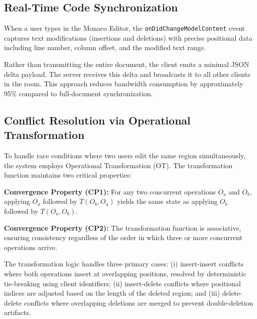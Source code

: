 \documentclass[conference]{IEEEtran}
\begin{document}
\subsection{Real-Time Code Synchronization}
When a user types in the Monaco Editor, the \texttt{onDidChangeModelContent} event captures text modifications (insertions and deletions) with precise positional data including line number, column offset, and the modified text range.

Rather than transmitting the entire document, the client emits a minimal JSON delta payload. The server receives this delta and broadcasts it to all other clients in the room. This approach reduces bandwidth consumption by approximately 95\% compared to full-document synchronization.

\subsection{Conflict Resolution via Operational Transformation}
To handle race conditions where two users edit the same region simultaneously, the system employs Operational Transformation (OT). The transformation function maintains two critical properties:

\textbf{Convergence Property (CP1):} For any two concurrent operations $O_a$ and $O_b$, applying $O_a$ followed by $T(O_b, O_a)$ yields the same state as applying $O_b$ followed by $T(O_a, O_b)$.

\textbf{Convergence Property (CP2):} The transformation function is associative, ensuring consistency regardless of the order in which three or more concurrent operations arrive.

\begin{algorithm}[H]
\SetAlgoLined
{}
 \caption{OT-Based Conflict Resolution}
\end{algorithm}

The transformation logic handles three primary cases: (i) insert-insert conflicts where both operations insert at overlapping positions, resolved by deterministic tie-breaking using client identifiers; (ii) insert-delete conflicts where positional indices are adjusted based on the length of the deleted region; and (iii) delete-delete conflicts where overlapping deletions are merged to prevent double-deletion artifacts.
\end{document}
